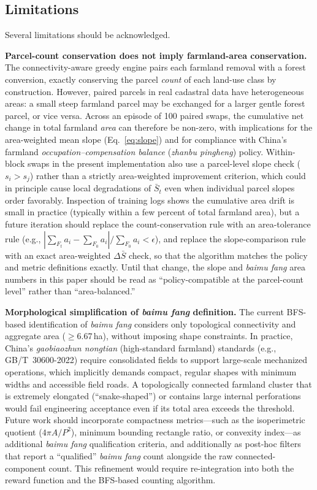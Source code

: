 \documentclass[preprint,12pt]{elsarticle}
\begin{document}
\subsection{Limitations}
\label{sec:limitations}

Several limitations should be acknowledged.

\textbf{Parcel-count conservation does not imply farmland-area conservation.} The connectivity-aware greedy engine pairs each farmland removal with a forest conversion, exactly conserving the parcel \textit{count} of each land-use class by construction. However, paired parcels in real cadastral data have heterogeneous areas: a small steep farmland parcel may be exchanged for a larger gentle forest parcel, or vice versa. Across an episode of 100 paired swaps, the cumulative net change in total farmland \textit{area} can therefore be non-zero, with implications for the area-weighted mean slope (Eq.~\ref{eq:slope}) and for compliance with China's farmland \textit{occupation--compensation balance} (\textit{zhanbu pingheng}) policy. Within-block swaps in the present implementation also use a parcel-level slope check ($s_i > s_j$) rather than a strictly area-weighted improvement criterion, which could in principle cause local degradations of $\bar{S}_t$ even when individual parcel slopes order favorably. Inspection of training logs shows the cumulative area drift is small in practice (typically within a few percent of total farmland area), but a future iteration should replace the count-conservation rule with an area-tolerance rule (e.g., $|\sum_{F_t} a_i - \sum_{F_0} a_i|/\sum_{F_0} a_i < \epsilon$), and replace the slope-comparison rule with an exact area-weighted $\Delta\bar{S}$ check, so that the algorithm matches the policy and metric definitions exactly. Until that change, the slope and \textit{baimu fang} area numbers in this paper should be read as ``policy-compatible at the parcel-count level'' rather than ``area-balanced.''

\textbf{Morphological simplification of \textit{baimu fang} definition.} The current BFS-based identification of \textit{baimu fang} considers only topological connectivity and aggregate area ($\geq$6.67\,ha), without imposing shape constraints. In practice, China's \textit{gaobiaozhun nongtian} (high-standard farmland) standards (e.g., GB/T~30600-2022) require consolidated fields to support large-scale mechanized operations, which implicitly demands compact, regular shapes with minimum widths and accessible field roads. A topologically connected farmland cluster that is extremely elongated (``snake-shaped'') or contains large internal perforations would fail engineering acceptance even if its total area exceeds the threshold. Future work should incorporate compactness metrics---such as the isoperimetric quotient ($4\pi A / P^2$), minimum bounding rectangle ratio, or convexity index---as additional \textit{baimu fang} qualification criteria, and additionally as post-hoc filters that report a ``qualified'' \textit{baimu fang} count alongside the raw connected-component count. This refinement would require re-integration into both the reward function and the BFS-based counting algorithm.
\end{document}

